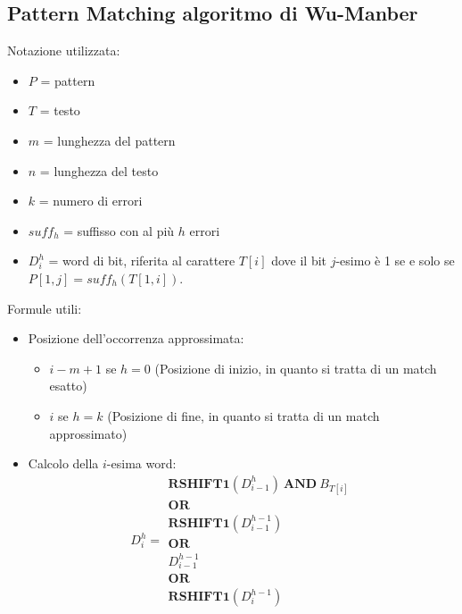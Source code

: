 \subsection{Pattern Matching algoritmo di Wu-Manber}
Notazione utilizzata:
\begin{itemize}
    \item $P$ = pattern
    \item $T$ = testo
    \item $m$ = lunghezza del pattern
    \item $n$ = lunghezza del testo
    \item $k$ = numero di errori
    \item $suff_h$ = suffisso con al più $h$ errori
    \item $D_i^h$ = word di bit, riferita al carattere $T[i]$ dove il bit
          $j$-esimo è 1 se e solo se $P[1, j] = suff_h(T[1, i])$.
\end{itemize}
Formule utili:
\begin{itemize}
    \item Posizione dell'occorrenza approssimata:
          \begin{itemize}
              \item $i - m + 1$ se $h = 0$ (Posizione di inizio, in quanto si
                    tratta di un match esatto)
              \item $i$ se $h = k$  (Posizione di fine, in quanto si tratta di
                    un match approssimato)
          \end{itemize}
    \item Calcolo della $i$-esima word:
          \begin{equation}
              D_i^h = \begin{array}{l}
                  \textbf{RSHIFT1}(D_{i - 1}^h) \ \textbf{AND} \ B_{T[i]} \\
                  \textbf{OR}                                             \\
                  \textbf{RSHIFT1}(D_{i - 1}^{h - 1})                     \\
                  \textbf{OR}                                             \\
                  D_{i - 1}^{h - 1}                                       \\
                  \textbf{OR}                                             \\
                  \textbf{RSHIFT1}(D_{i}^{h - 1})
              \end{array}
          \end{equation}
\end{itemize}

